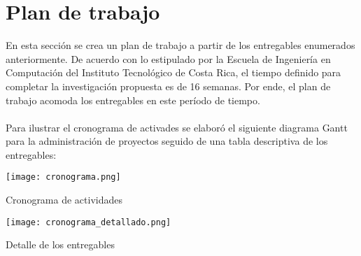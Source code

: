 \section{\textbf{Plan de trabajo}}\label{plan}
En esta secci\'on se crea un plan de trabajo a partir de los entregables enumerados anteriormente. De acuerdo con lo estipulado por la Escuela de Ingenier\'ia en Computaci\'on del Instituto Tecnol\'ogico de Costa Rica, el tiempo definido para completar la investigaci\'on propuesta es de 16 semanas. Por ende, el plan de trabajo acomoda los entregables en este per\'iodo de tiempo.
\\\\
Para ilustrar el cronograma de activades se elabor\'o el siguiente diagrama Gantt para la administraci\'on de proyectos seguido de una tabla descriptiva de los entregables:
\\
\begin{table}[ht]
\centering
\texttt{[image: cronograma.png]}
\caption{Cronograma de actividades}
\label{arm:tabla_gantt}
\begin{center}
\end{center}
\end{table}

\begin{table}[ht]
\centering
\texttt{[image: cronograma\_detallado.png]}
\caption{Detalle de los entregables}
\label{arm:tabla_entregables}
\begin{center}
\end{center}
\end{table}
